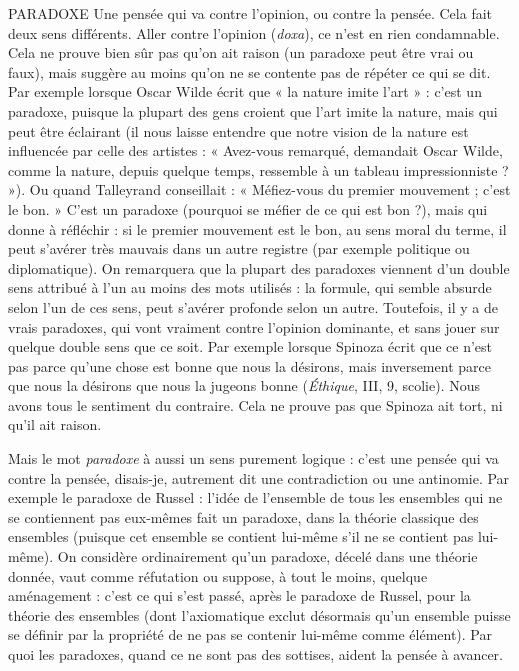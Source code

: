 PARADOXE Une pensée qui va contre l’opinion, ou contre la pensée.
Cela fait deux sens différents. Aller contre l'opinion ({\it doxa}), ce
n’est en rien condamnable. Cela ne prouve bien sûr pas qu’on ait raison (un
paradoxe peut être vrai ou faux), mais suggère au moins qu’on ne se contente
pas de répéter ce qui se dit. Par exemple lorsque Oscar Wilde écrit que « la
nature imite l’art » : c’est un paradoxe, puisque la plupart des gens croient que
l’art imite la nature, mais qui peut être éclairant (il nous laisse entendre que
notre vision de la nature est influencée par celle des artistes : « Avez-vous
remarqué, demandait Oscar Wilde, comme la nature, depuis quelque temps,
ressemble à un tableau impressionniste ? »). Ou quand Talleyrand conseillait :
« Méfiez-vous du premier mouvement ; c’est le bon. » C’est un paradoxe (pourquoi
se méfier de ce qui est bon ?), mais qui donne à réfléchir : si le premier
mouvement est le bon, au sens moral du terme, il peut s’avérer très mauvais
dans un autre registre (par exemple politique ou diplomatique). On remarquera
que la plupart des paradoxes viennent d’un double sens attribué à l’un au
moins des mots utilisés : la formule, qui semble absurde selon l’un de ces sens,
peut s'avérer profonde selon un autre. Toutefois, il y a de vrais paradoxes, qui
vont vraiment contre l'opinion dominante, et sans jouer sur quelque double
sens que ce soit. Par exemple lorsque Spinoza écrit que ce n’est pas parce
qu’une chose est bonne que nous la désirons, mais inversement parce que nous
la désirons que nous la jugeons bonne ({\it Éthique}, III, 9, scolie). Nous avons tous
le sentiment du contraire. Cela ne prouve pas que Spinoza ait tort, ni qu’il ait
raison.

Mais le mot {\it paradoxe} à aussi un sens purement logique : c’est une pensée
qui va contre la pensée, disais-je, autrement dit une contradiction ou une antinomie.
Par exemple le paradoxe de Russel : l’idée de l’ensemble de tous les
ensembles qui ne se contiennent pas eux-mêmes fait un paradoxe, dans la
théorie classique des ensembles (puisque cet ensemble se contient lui-même s’il
ne se contient pas lui-même). On considère ordinairement qu’un paradoxe,
décelé dans une théorie donnée, vaut comme réfutation ou suppose, à tout le
moins, quelque aménagement : c’est ce qui s’est passé, après le paradoxe de
Russel, pour la théorie des ensembles (dont l’axiomatique exclut désormais
qu’un ensemble puisse se définir par la propriété de ne pas se contenir lui-même
comme élément). Par quoi les paradoxes, quand ce ne sont pas des sottises,
aident la pensée à avancer.

